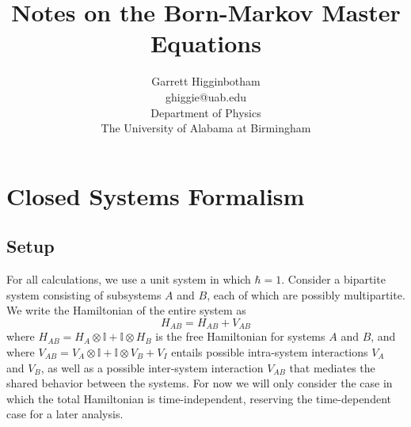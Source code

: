 \documentclass{article}
\newcommand{\ten}{\otimes}
\newcommand{\I}{\mathbb{I}}
\begin{document}


%
\title{Notes on the Born-Markov Master Equations}
\author{Garrett Higginbotham\\ghiggie@uab.edu\\Department of Physics\\The University of Alabama at Birmingham}

\maketitle
\tableofcontents

\section{Closed Systems Formalism}

\subsection{Setup}

For all calculations, we use a unit system in which $\hbar = 1$. Consider a bipartite system consisting of subsystems $A$ and $B$, each of which are possibly multipartite. We write the Hamiltonian of the entire system as
\begin{equation}\label{ham}
H_{AB} = H_{AB} + V_{AB}
\end{equation}
where $H_{AB} =  H_A\ten\I + \I\ten H_B$ is the free Hamiltonian for systems $A$ and $B$, and where $V_{AB} = V_A\ten\I + \I\ten V_B + V_I$ entails possible intra-system interactions $V_A$ and $V_B$, as well as a possible inter-system interaction $V_{AB}$ that mediates the shared behavior between the systems. For now we will only consider the case in which the total Hamiltonian is time-independent, reserving the time-dependent case for a later analysis.
\end{document}
